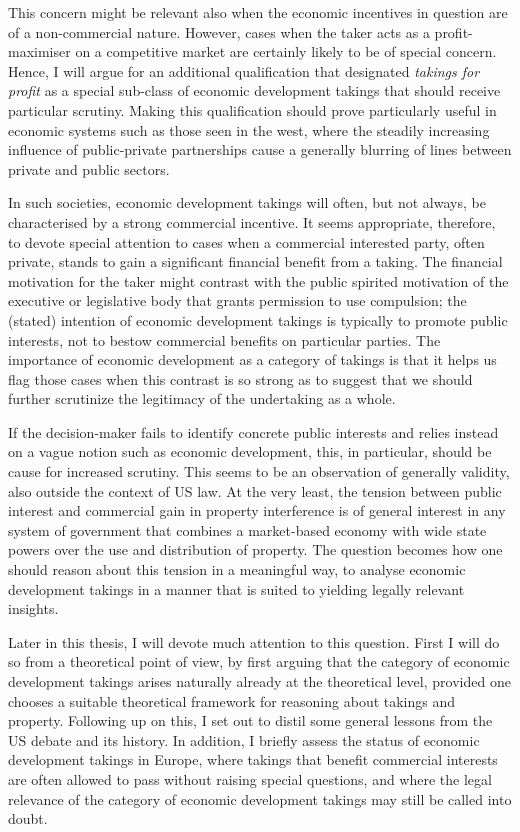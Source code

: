 This concern might be relevant also when the economic incentives in question are of a non-commercial nature. However, cases when the taker acts as a profit-maximiser on a competitive market are certainly likely to be of special concern. Hence, I will argue for an additional qualification that designated {\it takings for profit} as a special sub-class of economic development takings that should receive particular scrutiny. Making this qualification should prove particularly useful in economic systems such as those seen in the west, where the steadily increasing influence of public-private partnerships cause a generally blurring of lines between private and public sectors.

In such societies, economic development takings will often, but not always, be characterised by a strong commercial incentive. It seems appropriate, therefore, to devote special attention to cases when a commercial interested party, often private, stands to gain a significant financial benefit from a taking. The financial motivation for the taker might contrast with the public spirited motivation of the executive or legislative body that grants permission to use compulsion; the (stated) intention of economic development takings is typically to promote public interests, not to bestow commercial benefits on particular parties. The importance of economic development as a category of takings is that it helps us flag those cases when this contrast is so strong as to suggest that we should further scrutinize the legitimacy of the undertaking as a whole.

If the decision-maker fails to identify concrete public interests and relies instead on a vague notion such as economic development, this, in particular, should be cause for increased scrutiny. This seems to be an observation of generally validity, also outside the context of US law. At the very least, the tension between public interest and commercial gain in property interference is of general interest in any system of government that combines a market-based economy with wide state powers over the use and distribution of property. The question becomes how one should reason about this tension in a meaningful way, to analyse economic development takings in a manner that is suited to yielding legally relevant insights.

Later in this thesis, I will devote much attention to this question. First I will do so from a theoretical point of view, by first arguing that the category of economic development takings arises naturally already at the theoretical level, provided one chooses a suitable theoretical framework for reasoning about takings and property. Following up on this, I set out to distil some general lessons from the US debate and its history. In addition, I briefly assess the status of economic development takings in Europe, where takings that benefit commercial interests are often allowed to pass without raising special questions, and where the legal relevance of the category of economic development takings may still be called into doubt.


